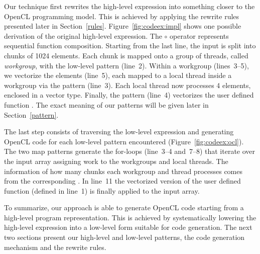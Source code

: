 Our technique first rewrites the high-level expression into something closer to the OpenCL programming model.
This is achieved by applying the rewrite rules presented later in Section~\ref{rules}.
Figure~\ref{fig:codeex:impl} shows one possible derivation of the original high-level expression.
The $\circ$ operator represents sequential function composition. %
Starting from the last line, the input is split into chunks of 1024 elements.
Each chunk is mapped onto a group of threads, called \emph{workgroup}, with the  low-level pattern (line~2).
Within a workgroup (lines~3--5), we vectorize the elements (line~5), each mapped to a local thread inside a workgroup via the  pattern (line~3).
Each local thread now processes 4 elements, enclosed in a vector type.
Finally, the  pattern (line~4) vectorizes the user defined function .
The exact meaning of our patterns will be given later in Section~\ref{pattern}.

The last step consists of traversing the low-level expression and generating OpenCL code for each low-level pattern encountered (Figure~\ref{fig:codeex:ocl}).
The two map patterns generate the for-loops (line~3--4 and~7--8) that iterate over the input array assigning work to the workgroups and local threads.
The information of how many chunks each workgroup and thread processes comes from the corresponding .
In line~11 the vectorized version of the user defined  function (defined in line~1) is finally applied to the input array.

To summarize, our approach is able to generate OpenCL code starting from a high-level program representation. %
This is achieved by systematically lowering the high-level expression into a low-level form suitable for code generation.
The next two sections present our high-level and low-level patterns, the code generation mechanism and the rewrite rules. %

